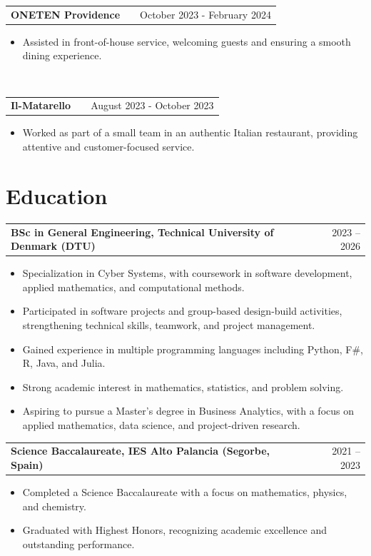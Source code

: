 \documentclass[a4paper,12pt]{article}
\makeatletter
\newenvironment{joblong}[2]
    {
    \begin{tabularx}{\linewidth}{@{}l X r@{}}
    \textbf{#1} & \hfill &  #2 \\[3.75pt]
    \end{tabularx}
    \begin{minipage}[t]{\linewidth}
    \begin{itemize}[nosep,after=\strut, leftmargin=1em, itemsep=3pt,label=--]
    }
    {
    \end{itemize}
    \end{minipage}    
    }
\makeatother
\begin{document}
\begin{joblong}{ONETEN Providence}{October 2023 - February 2024}
\item Assisted in front-of-house service, welcoming guests and ensuring a smooth dining experience.  
\end{joblong}\\
\begin{joblong}{Il-Matarello}{August 2023 - October 2023}
\item Worked as part of a small team in an authentic Italian restaurant, providing attentive and customer-focused service.  
\end{joblong}
\newpage
\section{Education}
\begin{joblong}{BSc in General Engineering, Technical University of Denmark (DTU)}{2023 -- 2026}
    \item Specialization in Cyber Systems, with coursework in software development, applied mathematics, and computational methods.
    \item Participated in software projects and group-based design-build activities, strengthening technical skills, teamwork, and project management.
    \item Gained experience in multiple programming languages including Python, F$\#$, R, Java, and Julia.  
    \item Strong academic interest in mathematics, statistics, and problem solving.
    \item Aspiring to pursue a Master’s degree in Business Analytics, with a focus on applied mathematics, data science, and project-driven research.  
\end{joblong}
\begin{joblong}{Science Baccalaureate, IES Alto Palancia (Segorbe, Spain)}{2021 -- 2023}
    \item Completed a Science Baccalaureate with a focus on mathematics, physics, and chemistry.  
    \item Graduated with Highest Honors, recognizing academic excellence and outstanding performance.  
\end{joblong}
\end{document}
